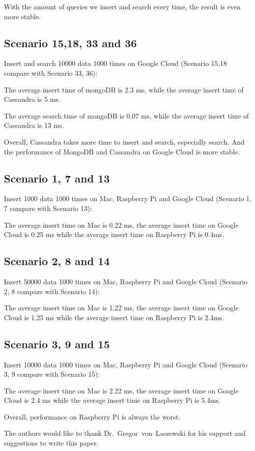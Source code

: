 With the amount of queries we insert and search every time,
the result is even more stable. 

\subsection{Scenario 15,18, 33 and 36}
Insert and search 10000 data 1000 times on Google Cloud 
(Scenario 15,18 compare with Scenario 33, 36):

The average insert time of mongoDB is 2.3 ms, while the average insert time of 
Cassandra is 5 ms.

The average search time of mongoDB is 0.07 ms, while the average insert time of 
Cassandra is 13 ms.

Overall, Cassandra takes more time to insert and search, especially search. 
And the performance of MongoDB and Cassandra on Google Cloud is more stable.


\subsection{Scenario 1, 7 and 13}
Insert 1000 data 1000 times on Mac, Raspberry Pi and Google Cloud
(Scenario 1, 7  compare with Scenario 13):

The average insert time on Mac  is 0.22 ms, the average insert time on Google Cloud
 is 0.25 ms while the average insert time on  Raspberry Pi is 0.4ms.

\subsection{Scenario 2, 8  and 14}
Insert 50000 data 1000 times on Mac, Raspberry Pi and Google Cloud
(Scenario 2, 8 compare with Scenario 14):

The average insert time on Mac is 1.22 ms, the average insert time on Google Cloud
 is 1.25 ms while the average insert time on  Raspberry Pi is 2.4ms.


\subsection{Scenario 3, 9 and 15}
Insert 10000 data 1000 times on Mac, Raspberry Pi and Google Cloud
(Scenario 3, 9 compare with Scenario 15):

The average insert time on Mac is 2.22 ms, the average insert time on Google Cloud
 is 2.4 ms while the average insert time on  Raspberry Pi is 5.4ms.
 
Overall,  performance on Raspberry Pi is  always the worst.

\begin{acks}

  The authors would like to thank Dr.~Gregor~von~Laszewski for his
  support and suggestions to write this paper.

\end{acks}


 

